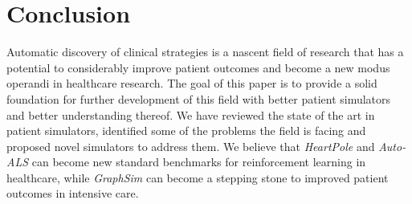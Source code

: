 \section{Conclusion}
\label{sec:conclusion}

Automatic discovery of clinical strategies is a nascent field of research that has a potential to considerably improve patient outcomes and become a new modus operandi in healthcare research.
The goal of this paper is to provide a solid foundation for further development of this field with better patient simulators and better understanding thereof.
We have reviewed the state of the art in patient simulators, identified some of the problems the field is facing and proposed novel simulators to address them.
We believe that \emph{HeartPole} and \emph{Auto-ALS} can become new standard benchmarks for reinforcement learning in healthcare, while \emph{GraphSim} can become a stepping stone to improved patient outcomes in intensive care.